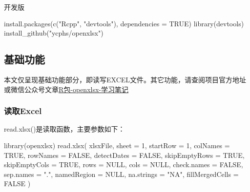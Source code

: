 \documentclass[
]{book}
\newenvironment{Shaded}{\begin{snugshade}}{\end{snugshade}}
\newcommand{\AttributeTok}[1]{\textcolor[rgb]{0.77,0.63,0.00}{#1}}
\newcommand{\ConstantTok}[1]{\textcolor[rgb]{0.00,0.00,0.00}{#1}}
\newcommand{\DecValTok}[1]{\textcolor[rgb]{0.00,0.00,0.81}{#1}}
\newcommand{\FunctionTok}[1]{\textcolor[rgb]{0.00,0.00,0.00}{#1}}
\newcommand{\NormalTok}[1]{#1}
\newcommand{\StringTok}[1]{\textcolor[rgb]{0.31,0.60,0.02}{#1}}
\begin{document}
开发版

\begin{Shaded}
\begin{Highlighting}[]
\FunctionTok{install.packages}\NormalTok{(}\FunctionTok{c}\NormalTok{(}\StringTok{"Rcpp"}\NormalTok{, }\StringTok{"devtools"}\NormalTok{), }\AttributeTok{dependencies =} \ConstantTok{TRUE}\NormalTok{)}
\FunctionTok{library}\NormalTok{(devtools)}
\FunctionTok{install\_github}\NormalTok{(}\StringTok{"ycphs/openxlsx"}\NormalTok{)}
\end{Highlighting}
\end{Shaded}

\hypertarget{ux57faux7840ux529fux80fd}{%
\subsection{基础功能}\label{ux57faux7840ux529fux80fd}}

本文仅呈现基础功能部分，即读写EXCEL文件。其它功能，请查阅项目官方地址或微信公众号文章\href{https://mp.weixin.qq.com/s/ZD0dJb0y8fsWGI1dCPh2mQ}{R包-openxlsx-学习笔记}

\hypertarget{ux8bfbux53d6excel}{%
\subsubsection{读取Excel}\label{ux8bfbux53d6excel}}

read.xlsx()是读取函数，主要参数如下：

\begin{Shaded}
\begin{Highlighting}[]
\FunctionTok{library}\NormalTok{(openxlsx)}
\FunctionTok{read.xlsx}\NormalTok{(}
\NormalTok{  xlsxFile,}
  \AttributeTok{sheet =} \DecValTok{1}\NormalTok{,}
  \AttributeTok{startRow =} \DecValTok{1}\NormalTok{,}
  \AttributeTok{colNames =} \ConstantTok{TRUE}\NormalTok{,}
  \AttributeTok{rowNames =} \ConstantTok{FALSE}\NormalTok{,}
  \AttributeTok{detectDates =} \ConstantTok{FALSE}\NormalTok{,}
  \AttributeTok{skipEmptyRows =} \ConstantTok{TRUE}\NormalTok{,}
  \AttributeTok{skipEmptyCols =} \ConstantTok{TRUE}\NormalTok{,}
  \AttributeTok{rows =} \ConstantTok{NULL}\NormalTok{,}
  \AttributeTok{cols =} \ConstantTok{NULL}\NormalTok{,}
  \AttributeTok{check.names =} \ConstantTok{FALSE}\NormalTok{,}
  \AttributeTok{sep.names =} \StringTok{"."}\NormalTok{,}
  \AttributeTok{namedRegion =} \ConstantTok{NULL}\NormalTok{,}
  \AttributeTok{na.strings =} \StringTok{"NA"}\NormalTok{,}
  \AttributeTok{fillMergedCells =} \ConstantTok{FALSE}
\NormalTok{)}
\end{Highlighting}
\end{Shaded}
\end{document}
